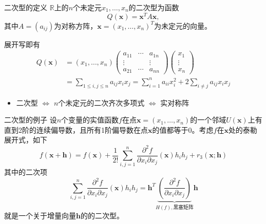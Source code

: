 \begin{frame}

\begin{block}{二次型的定义}
$\mathbb{R}$上的$n$个未定元$x_1,\ldots,x_n$的二次型为函数
\[Q(\mathbf{x}) = \mathbf{x}^TA\mathbf{x},\]
其中$A = (a_{ij})$为对称方阵，$\mathbf{x} = (x_1,\ldots,x_n)^T$为未定元的向量。

\pause

展开写即有
\begin{align*}
Q(\mathbf{x}) & = (x_1,\ldots,x_n) \begin{pmatrix} a_{11} & \cdots & a_{1n} \\ \vdots & & \vdots \\ a_{21} & \cdots & a_{nn} \end{pmatrix} \begin{pmatrix} x_1 \\ \vdots \\ x_n \end{pmatrix} \\
& = \sum\limits_{1\leqslant i,j \leqslant n} a_{ij}x_ix_j = \sum\limits_{i=1}^{n} a_{ii}x_i^2 + 2\sum\limits_{i\neq j} a_{ij}x_ix_j
\end{align*}

\pause

\begin{itemize}
\item 二次型 $\Longleftrightarrow$ $n$个未定元的二次齐次多项式 $\Longleftrightarrow$ 实对称阵
\end{itemize}
\end{block}

\end{frame}


\begin{frame}

\begin{block}{二次型的例子}
设$n$个变量的实值函数$f$在点$\mathbf{x} = (x_1,\ldots,x_n)$的一个邻域$U(\mathbf{x})$上有直到2阶的连续偏导数，且所有1阶偏导数在点$\mathbf{x}$的值都等于0。考虑$f$在$\mathbf{x}$处的泰勒展开式，如下
\[f(\mathbf{x} + \mathbf{h}) = f(\mathbf{x}) + \dfrac{1}{2!} \sum\limits_{i,j=1}^n \dfrac{\partial^2 f}{\partial x_i \partial x_j}(\mathbf{x})h_ih_j + r_3(\mathbf{x}; \mathbf{h})\]
其中的二次项
\[\sum\limits_{i,j=1}^n \dfrac{\partial^2 f}{\partial x_i \partial x_j}(\mathbf{x})h_ih_j = \mathbf{h}^T \underbrace{\left( \dfrac{\partial^2 f}{\partial x_i \partial x_j} \right)}_{H(f), \text{黑塞矩阵}} \mathbf{h}\]
就是一个关于增量向量$\mathbf{h}$的的二次型。
\end{block}

\end{frame}

